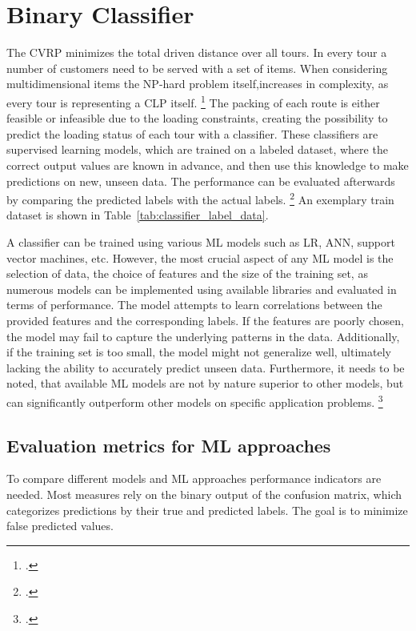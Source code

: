 \chapter{Binary Classifier}
\label{chap:classifier}

The \gls{CVRP} minimizes the total driven distance over all tours. In every tour
a number of customers need to be served with a set of items. When considering multidimensional items
the NP-hard problem itself,increases in complexity, as every tour is representing a \gls{CLP} itself. \footcite[cf.][pp. 1--2]{tamke_branch-and-cut_2024}
The packing of each route is either feasible or infeasible due to the loading constraints,
creating the possibility to predict the loading status of each tour with a classifier.
These classifiers are supervised learning models, which are trained on a labeled dataset,
where the correct output values are known in advance, and then use this knowledge to
make predictions on new, unseen data. The performance can be evaluated afterwards by comparing
the predicted labels with the actual labels. \footcite[cf.][]{kotsiantis_supervised_2007}
An exemplary train dataset is shown in Table~\ref{tab:classifier_label_data}.



A classifier can be trained using various \gls{ML} models such as \gls{LR},
\gls{ANN}, support vector machines, etc. However, the most crucial aspect of any
\gls{ML} model is the selection of data, the choice of features and the size of the training set,
as numerous models can be implemented using available libraries and evaluated in terms of performance.
The model attempts to learn correlations between the provided features
and the corresponding labels. If the features are poorly chosen, the model may fail
to capture the underlying patterns in the data. Additionally, if the training set
is too small, the model might not generalize well, ultimately lacking the ability
to accurately predict unseen data. Furthermore, it needs to be noted, that available
\gls{ML} models are not by nature superior to other models, but can significantly outperform
other models on specific application problems. \footcite[cf.][pp. 250, 264]{kotsiantis_supervised_2007}


\section{Evaluation metrics for ML approaches}
\label{sec:classifier_objectives}
To compare different models and \gls{ML} approaches performance indicators are needed. Most measures rely
on the binary output of the confusion matrix, which categorizes predictions by their true and predicted labels.
The goal is to minimize false predicted values.

